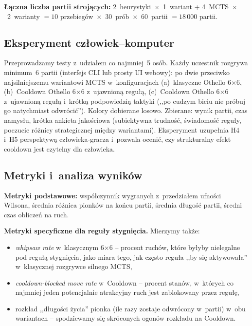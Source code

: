\documentclass[11pt,a4paper]{article}
\begin{document}
\textbf{Łączna liczba partii strojących:} 2~heurystyki~$\times$~1~wariant + 4~MCTS~$\times$~2~warianty $= 10$ przebiegów~$\times$~30~prób~$\times$~60~partii $= 18\,000$ partii.

\subsection{Eksperyment człowiek--komputer}

Przeprowadzamy testy z~udziałem co najmniej~5 osób. Każdy uczestnik rozgrywa minimum~6 partii (interfejs CLI lub prosty UI webowy): po dwie przeciwko najsilniejszemu wariantowi MCTS w~konfiguracjach (a)~klasyczne Othello 6$\times$6, (b)~Cooldown Othello 6$\times$6 z~ujawnioną regułą, (c)~Cooldown Othello 6$\times$6 z~ujawnioną regułą i~krótką podpowiedzią taktyki (,,po cudzym biciu nie próbuj go natychmiast odwrócić''). Kolory dobierane losowo. Zbierane: wynik partii, czas namysłu, krótka ankieta jakościowa (subiektywna trudność, świadomość reguły, poczucie różnicy strategicznej między wariantami). Eksperyment uzupełnia H4 i~H5 perspektywą człowieka-gracza i~pozwala ocenić, czy strukturalny efekt cooldown jest czytelny dla człowieka.

\subsection{Metryki i~analiza wyników}

\textbf{Metryki podstawowe:} współczynnik wygranych z~przedziałem ufności Wilsona, średnia różnica pionków na końcu partii, średnia długość partii, średni czas obliczeń na ruch.

\textbf{Metryki specyficzne dla reguły stygnięcia.} Mierzymy także:
\begin{itemize}[leftmargin=1.5em,itemsep=2pt]
    \item \emph{whipsaw rate} w~klasycznym 6$\times$6 -- procent ruchów, które byłyby nielegalne pod regułą stygnięcia, jako miara tego, jak często reguła ,,by się aktywowała'' w~klasycznej rozgrywce silnego MCTS,
    \item \emph{cooldown-blocked move rate} w~Cooldown -- procent stanów, w~których co najmniej jeden potencjalnie atrakcyjny ruch jest zablokowany przez regułę,
    \item rozkład ,,długości życia'' pionka (ile razy zostaje odwrócony w~partii) w~obu wariantach -- spodziewamy się skróconych ogonów rozkładu na Cooldown.
\end{itemize}
\end{document}
